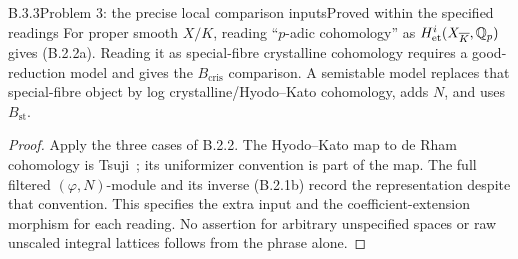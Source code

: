 \begin{result}{B.3.3}{Problem 3: the precise local comparison inputs}{Proved within the specified readings}
For proper smooth $X/K$, reading ``$p$-adic cohomology'' as
$H^i_{\mathrm{et}}(X_{\overline K},\mathbb Q_p)$ gives (B.2.2a).
Reading it as special-fibre crystalline cohomology requires a
good-reduction model and gives the $B_{\mathrm{cris}}$
comparison. A semistable model replaces that special-fibre
object by log crystalline/Hyodo--Kato cohomology, adds $N$, and
uses $B_{\mathrm{st}}$.
\end{result}
\begin{proof}
Apply the three cases of B.2.2. The Hyodo--Kato map to de Rham
cohomology is Tsuji~\cite[Theorem 3.2.1]{Tsuji1998ICM}; its
uniformizer convention is part of the map. The full filtered
$(\varphi,N)$-module and its inverse (B.2.1b) record the
representation despite that convention. This specifies the
extra input and the coefficient-extension morphism for each
reading. No assertion for arbitrary unspecified spaces or raw
unscaled integral lattices follows from the phrase alone.
\end{proof}

